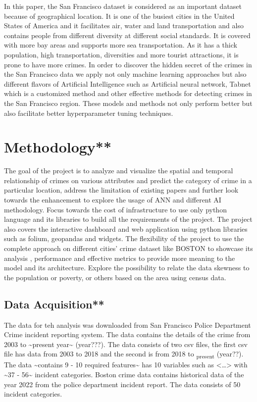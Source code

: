 \documentclass[conference,final,]{IEEEtran}
\begin{document}
In this paper, the San Francisco dataset is considered as an important
dataset because of geographical location. It is one of the busiest
cities in the United States of America and it facilitates air, water and
land transportation and also contains people from different diversity at
different social standards. It is covered with more bay areas and
supports more sea transportation. As it has a thick population, high
transportation, diversities and more tourist attractions, it is prone to
have more crimes. In order to discover the hidden secret of the crimes
in the San Francisco data we apply not only machine learning approaches
but also different flavors of Artificial Intelligence such as Artificial
neural network, Tabnet which is a customized method and other effective
methods for detecting crimes in the San Francisco region. These models
and methods not only perform better but also facilitate better
hyperparameter tuning techniques.

\section{Methodology**}\label{methodology}

The goal of the project is to analyze and visualize the spatial and
temporal relationship of crimes on various attributes and predict the
category of crime in a particular location, address the limitation of
existing papers and further look towards the enhancement to explore the
usage of ANN and different AI methodology. Focus towards the cost of
infrastructure to use only python language and its libraries to build
all the requirements of the project. The project also covers the
interactive dashboard and web application using python libraries such as
folium, geopandas and widgets. The flexibility of the project to use the
complete approach on different cities' crime dataset like BOSTON to
showcase its analysis , performance and effective metrics to provide
more meaning to the model and its architecture. Explore the possibility
to relate the data skewness to the population or poverty, or others
based on the area using census data.

\subsection{Data Acquisition**}\label{data-acquisition}

The data for teh analysis was downloaded from San Francisco Police
Department Crime incident reporting system. The data contains the
details of the crime from 2003 to \textasciitilde present
year\textasciitilde{} (year???). The data consists of two csv files, the
first csv file has data from 2003 to 2018 and the second is from 2018 to
\textsubscript{present} (year??). The data \textasciitilde contains 9 -
10 required features\textasciitilde{} has 10 variables such as
\textless\ldots\textgreater{} with \textasciitilde37 -
56\textasciitilde{} incident categories. Boston crime data contains
historical data of the year 2022 from the police department incident
report. The data consists of 50 incident categories.
\end{document}
